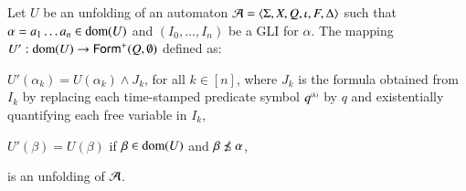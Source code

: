 \begin{lemma}\label{lemma:refinement}
  Let $U$ be an unfolding of an automaton $\mathcal{A} =
  \langle \Sigma,X,Q,\iota,F,\Delta \rangle$ such that $\alpha = a_1\ldots a_n
  \in \mathrm{dom}(U)$ and $(I_0, \ldots, I_n)$ be a GLI for $\alpha$. The
  mapping $U' : \mathrm{dom}(U) \rightarrow \mathsf{Form}^+(Q,\emptyset)$ defined as: 
  \begin{compactitem}
  \item $U'(\alpha_k) = U(\alpha_k) \wedge J_k$, for all $k \in [n]$,
    where $J_k$ is the formula obtained from $I_k$ by replacing each
    time-stamped predicate symbol ${q}^{\scriptscriptstyle{({k})}}$ by $q$ and
    existentially quantifying each free variable in $I_k$,
\item $U'(\beta) = U(\beta)$ if $\beta \in \mathrm{dom}(U)$ and $\beta
  \not\prefix \alpha$,
  \end{compactitem}
  is an unfolding of $\mathcal{A}$. 
\end{lemma}
